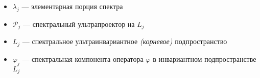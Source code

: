 \begin{definition}
    \begin{itemize}
        \item $\lambda_j$ --- элементарная порция спектра
        \item $\mathcal P_j$ --- спектральный ультрапроектор на $L_j$
        \item $L_j$ --- спектральное ультраинвариантное \textit{(корневое)} подпространство
        \item $\varphi_j$ --- спектральная компонента оператора $\varphi$ в инвариантном подпространстве $L_j$
    \end{itemize}
\end{definition}

